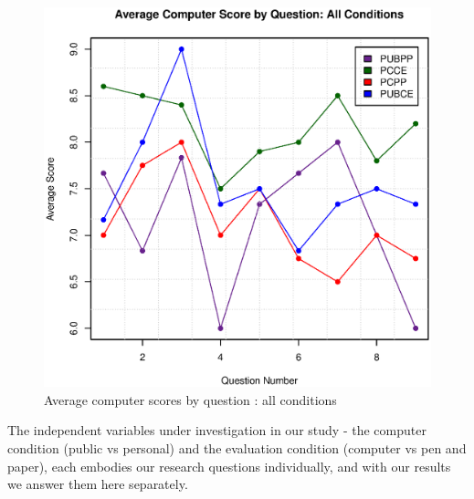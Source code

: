 \documentclass{sig-alternate-05-2015}
\begin{document}
\begin{figure}[h]
\includegraphics[width=\columnwidth]{FourCondtionAverageScores}
\centering
\caption{Average computer scores by question : all conditions}
\label{fig:fourCondAvg}
\end{figure}

\begin{table}[h]
\caption{Analysis of Variance Results}
\label{table:anova}
\end{table}

The independent variables under investigation in our study - the computer condition (public vs personal) and the evaluation condition (computer vs pen and paper), each embodies our research questions individually, and with our results we answer them here separately.\\
\end{document}
